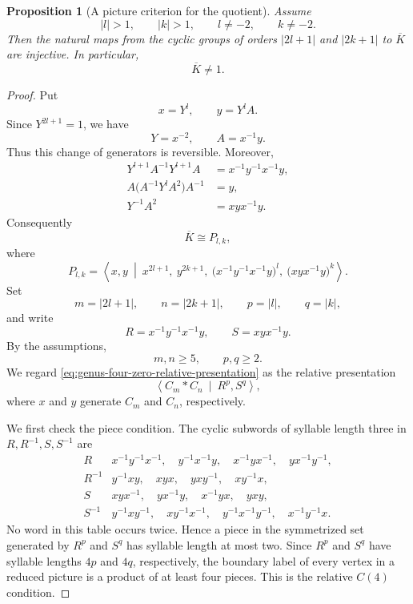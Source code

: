 \documentclass{article}
\newtheorem{prop}[theorem]{Proposition}
\begin{document}
\begin{prop}[A picture criterion for the quotient]
\label{prop:genus-four-zero-quotient-picture}
Assume
\[
 |l|>1,\qquad |k|>1,\qquad l\neq-2,\qquad k\neq-2.
\]
Then the natural maps from the cyclic groups of orders
\(|2l+1|\) and \(|2k+1|\) to \(\overline K\) are injective.
In particular,
\[
 \overline K\neq1.
\]
\end{prop}

\begin{proof}
Put
\[
 x=Y^l,
 \qquad
 y=Y^lA.
\]
Since \(Y^{2l+1}=1\), we have
\[
 Y=x^{-2},
 \qquad
 A=x^{-1}y.
\]
Thus this change of generators is reversible.  Moreover,
\[
\begin{aligned}
Y^{l+1}A^{-1}Y^{l+1}A
 &=x^{-1}y^{-1}x^{-1}y,\\
A\bigl(A^{-1}Y^lA^2\bigr)A^{-1}
 &=y,\\
Y^{-1}A^2
 &=xyx^{-1}y.
\end{aligned}
\]
Consequently
\[
\overline K\cong P_{l,k},
\]
where
\begin{equation}
\label{eq:genus-four-zero-relative-presentation}
P_{l,k}=
\left\langle x,y\ \middle|\
 x^{2l+1},\ y^{2k+1},\
 \bigl(x^{-1}y^{-1}x^{-1}y\bigr)^l,\
 \bigl(xyx^{-1}y\bigr)^k
\right\rangle .
\end{equation}
Set
\[
 m=|2l+1|,
 \qquad n=|2k+1|,
 \qquad p=|l|,
 \qquad q=|k|,
\]
and write
\[
 R=x^{-1}y^{-1}x^{-1}y,
 \qquad
 S=xyx^{-1}y.
\]
By the assumptions,
\[
 m,n\geq5,
 \qquad
 p,q\geq2.
\]
We regard \eqref{eq:genus-four-zero-relative-presentation} as the
relative presentation
\[
 \left\langle C_m*C_n\ \middle|\ R^p,S^q\right\rangle,
\]
where \(x\) and \(y\) generate \(C_m\) and \(C_n\), respectively.

We first check the piece condition.  The cyclic subwords of syllable
length three in \(R,R^{-1},S,S^{-1}\) are
\[
\begin{array}{c|l}
R
 &x^{-1}y^{-1}x^{-1},\quad y^{-1}x^{-1}y,\quad
   x^{-1}yx^{-1},\quad yx^{-1}y^{-1},\\[1mm]
R^{-1}
 &y^{-1}xy,\quad xyx,\quad yxy^{-1},\quad xy^{-1}x,\\[1mm]
S
 &xyx^{-1},\quad yx^{-1}y,\quad x^{-1}yx,\quad yxy,\\[1mm]
S^{-1}
 &y^{-1}xy^{-1},\quad xy^{-1}x^{-1},\quad
   y^{-1}x^{-1}y^{-1},\quad x^{-1}y^{-1}x.
\end{array}
\]
No word in this table occurs twice.  Hence a piece in the symmetrized
set generated by \(R^p\) and \(S^q\) has syllable length at most two.
Since \(R^p\) and \(S^q\) have syllable lengths \(4p\) and \(4q\),
respectively, the boundary label of every vertex in a reduced picture
is a product of at least four pieces.  This is the relative
\(C(4)\) condition.


\end{proof}
\end{document}
